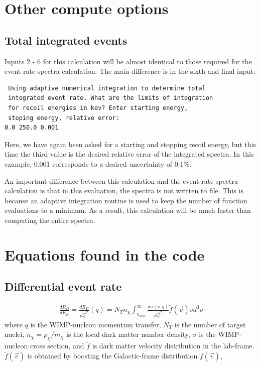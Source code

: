 \documentclass[11pt]{article}
\begin{document}
\clearpage

\section{Other compute options}


\subsection{Total integrated events}
Inputs 2 - 6 for this calculation will be almost identical to those required for
the event rate spectra calculation. The main difference is in the sixth and
final input:
\begin{verbatim}
 Using adaptive numerical integration to determine total 
 integrated event rate. What are the limits of integration 
 for recoil energies in kev? Enter starting energy, 
 stoping energy, relative error:
0.0 250.0 0.001
\end{verbatim}
Here, we have again been asked for a starting and stopping recoil energy, but
this time the third value is the desired relative error of the integrated
spectra. In this example, 0.001 corresponds to a desired uncertainty of 0.1\%. 

An important difference between this calculation and the event rate spectra
calculation is that in this evaluation, the spectra is not written to file. This
is because an adaptive integration routine is used to keep the number of
function evaluations to a minimum. As a result, this calculation will be much
faster than computing the entire spectra.


\section{Equations found in the code}
\subsection{Differential event rate}
\begin{equation}\label{ER}
\begin{split}
	\frac{dR_D}{dE_R} = \frac{dR_D}{d\vec{q}^2}(q)
	 = N_T n_\chi \int_{v_{min}}^\infty \frac{d\sigma(v,q)}{d\vec{q}^2} \tilde{f}(\vec{v})vd^3v
\end{split}
\end{equation}
where $q$ is the WIMP-nucleon momentum transfer, $N_T$ is the number of target 
nuclei, $n_\chi = \rho_\chi/m_\chi$ is the local dark matter number density, $\sigma$ 
is the WIMP-nucleon cross section, and $\tilde{f}$ is dark matter velocity 
distribution in the lab-frame. $\tilde{f}(\vec{v})$ is obtained by boosting 
the Galactic-frame distribution $f(\vec{v})$, 
\end{document}
